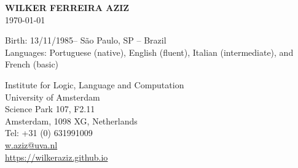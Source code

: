 \documentclass[10pt,a4paper,oneside]{article}
\makeatletter
\newcommand{\myname}{WILKER FERREIRA AZIZ\xspace}
\newcommand{\birthday}{13/11/1985\xspace}
\newcommand{\location}{S\~ao Paulo, SP -- Brazil\xspace}
\newcommand{\citizenships}{Brazilian\xspace}
\newcommand{\contact}{Institute for Logic, Language and Computation \\
University of Amsterdam \\
Science Park 107, F2.11 \\
Amsterdam, 1098 XG, Netherlands  \\
Tel: +31 (0) 631991009 \\
\url{w.aziz@uva.nl} \\
\url{https://wilkeraziz.github.io} 
}
\makeatother
\begin{document}




\begin{center}
{\large \bf
\myname \\
}
{\small
\today \\
}
\end{center}

Birth: \birthday -- \location \\
Languages: Portuguese (native), English (fluent), Italian (intermediate), and French (basic)
\vspace{2mm}


\begin{addmargin}[0em]{2em}%
\contact
\end{addmargin}








%


\end{document}
